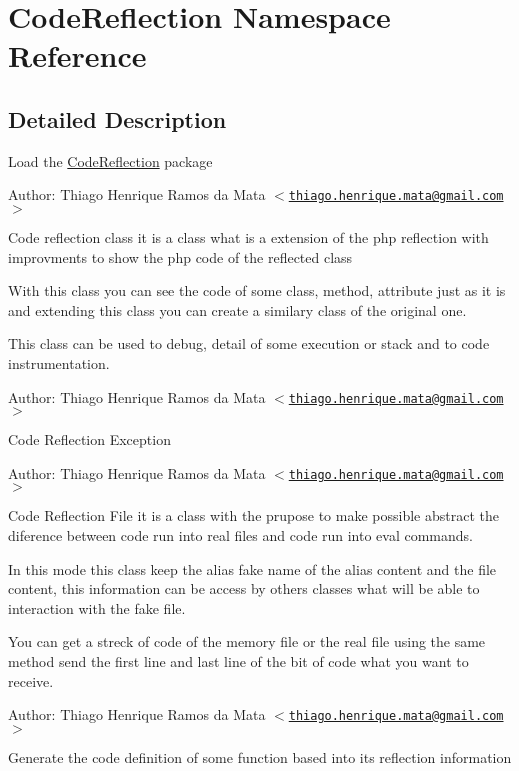 \hypertarget{namespace_code_reflection}{
\section{CodeReflection Namespace Reference}
\label{namespace_code_reflection}
}


\subsection{Detailed Description}
Load the \hyperlink{namespace_code_reflection}{CodeReflection} package \begin{Desc}
\item[Author:]Thiago Henrique Ramos da Mata $<$\href{mailto:thiago.henrique.mata@gmail.com}{\tt thiago.henrique.mata@gmail.com}$>$\end{Desc}
Code reflection class it is a class what is a extension of the php reflection with improvments to show the php code of the reflected class

With this class you can see the code of some class, method, attribute just as it is and extending this class you can create a similary class of the original one.

This class can be used to debug, detail of some execution or stack and to code instrumentation.

\begin{Desc}
\item[Author:]Thiago Henrique Ramos da Mata $<$\href{mailto:thiago.henrique.mata@gmail.com}{\tt thiago.henrique.mata@gmail.com}$>$\end{Desc}
Code Reflection Exception

\begin{Desc}
\item[Author:]Thiago Henrique Ramos da Mata $<$\href{mailto:thiago.henrique.mata@gmail.com}{\tt thiago.henrique.mata@gmail.com}$>$\end{Desc}
Code Reflection File it is a class with the prupose to make possible abstract the diference between code run into real files and code run into eval commands.

In this mode this class keep the alias fake name of the alias content and the file content, this information can be access by others classes what will be able to interaction with the fake file.

You can get a streck of code of the memory file or the real file using the same method send the first line and last line of the bit of code what you want to receive. \begin{Desc}
\item[Author:]Thiago Henrique Ramos da Mata $<$\href{mailto:thiago.henrique.mata@gmail.com}{\tt thiago.henrique.mata@gmail.com}$>$\end{Desc}
Generate the code definition of some function based into its reflection information

